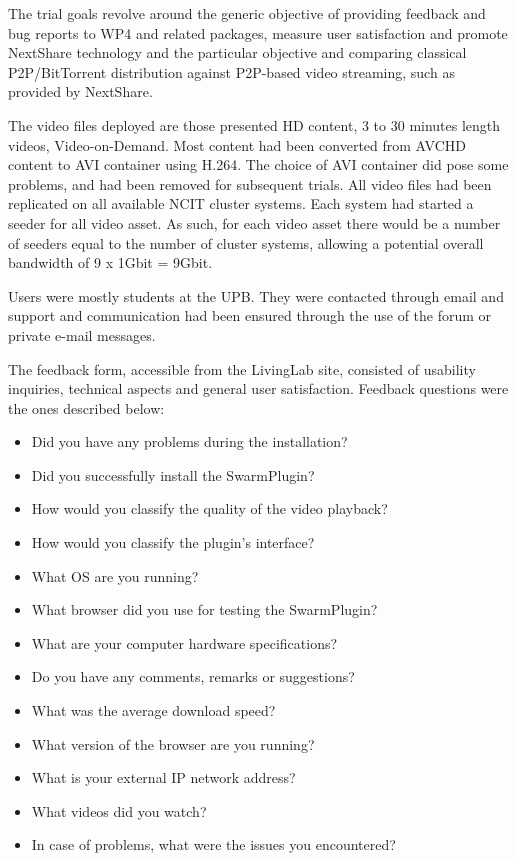The trial goals revolve around the generic objective of providing feedback and
bug reports to WP4 and related packages, measure user satisfaction and promote
NextShare technology and the particular objective and comparing classical
P2P/BitTorrent distribution against P2P-based video streaming, such as
provided by NextShare.

The video files deployed are those presented HD content, 3 to 30 minutes
length videos, Video-on-Demand. Most content had been converted from AVCHD
content to AVI container using H.264. The choice of AVI container did pose
some problems, and had been removed for
subsequent trials. All video files had been replicated on all available NCIT
cluster systems. Each system had started a seeder for all video asset. As
such, for each video asset there would be a number of seeders equal to the
number of cluster systems, allowing a potential overall bandwidth of 9 x 1Gbit
= 9Gbit.

Users were mostly students at the UPB. They were contacted through email and
support and communication had been ensured through the use of the forum or
private e-mail messages.

The feedback form, accessible from the LivingLab site, consisted of usability
inquiries, technical aspects and general user satisfaction. Feedback questions
were the ones described below:
\begin{itemize}
  \item Did you have any problems during the installation?
  \item Did you successfully install the SwarmPlugin?
  \item How would you classify the quality of the video playback?
  \item How would you classify the plugin's interface?
  \item What OS are you running?
  \item What browser did you use for testing the SwarmPlugin?
  \item What are your computer hardware specifications?
  \item Do you have any comments, remarks or suggestions?
  \item What was the average download speed?
  \item What version of the browser are you running?
  \item What is your external IP network address?
  \item What videos did you watch?
  \item In case of problems, what were the issues you encountered?
\end{itemize}

